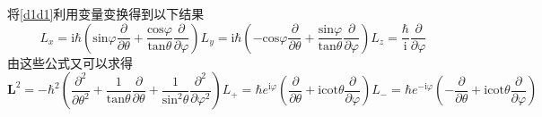 \documentclass[]{article}
\begin{document}
将\eqref{d1d1}利用变量变换得到以下结果
\begin{subequations}
	\begin{equation}
		L_x=\mathrm{i}\hbar\left( \mathrm{sin}\varphi\dfrac{\partial}{\partial\theta}+\dfrac{\mathrm{cos}\varphi}{\mathrm{tan}\theta}\dfrac{\partial}{\partial\varphi}\right) 
	\end{equation}
	\begin{equation}
		L_y=\mathrm{i}\hbar\left( -\mathrm{cos}\varphi\dfrac{\partial}{\partial\theta}+\dfrac{\mathrm{sin}\varphi}{\mathrm{tan}\theta}\dfrac{\partial}{\partial\varphi}\right)
	\end{equation}
	\begin{equation}
		L_z=\dfrac{\hbar}{\mathrm{i}}\dfrac{\partial}{\partial\varphi}
		\label{d5cd5c}
	\end{equation}
\end{subequations}
由这些公式又可以求得
\begin{subequations}
	\begin{equation}
		\boldsymbol{L}^2=-\hbar^2\left( \dfrac{\partial^2}{\partial\theta^2}+\dfrac{1}{\mathrm{tan}\theta}\dfrac{\partial}{\partial\theta}+\dfrac{1}{\mathrm{sin}^2\theta}\dfrac{\partial^2}{\partial\varphi^2}\right) 
	\end{equation}
	\begin{equation}
		L_+=\hbar e^{\mathrm{i}\varphi}\left( \dfrac{\partial}{\partial\theta}+\mathrm{i}\mathrm{cot}\theta\dfrac{\partial}{\partial\varphi}\right) 
		\label{d6bd6b}
	\end{equation}
	\begin{equation}
		L_-=\hbar e^{-\mathrm{i}\varphi}\left( -\dfrac{\partial}{\partial\theta}+\mathrm{i}\mathrm{cot}\theta\dfrac{\partial}{\partial\varphi}\right)
		\label{d6cd6c}
	\end{equation}
\label{d6d6}
\end{subequations}
\end{document}
